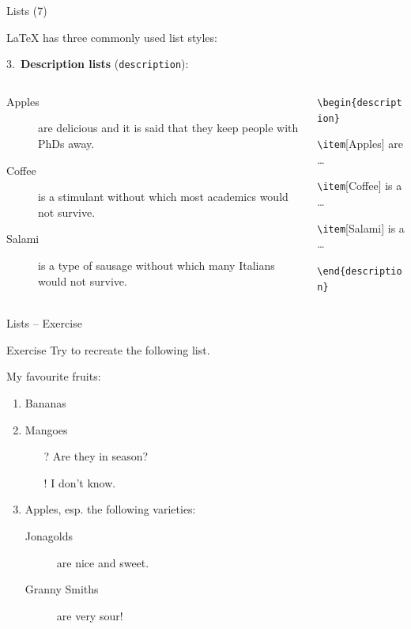 \documentclass{beamer}
\newcommand{\code}[1]{\texttt{#1}}
\newcommand{\switch}[1]{\texttt{\textbackslash#1}}
\newcommand{\command}[2]{\texttt{\textbackslash#1\{#2\}}}
\begin{document}
\begin{frame}{Lists (7)}

    \LaTeX{} has three commonly used list styles:

    \bigskip

    3.\ \textbf{Description lists} (\code{description}):

    \begin{columns}[t]
        \begin{column}{0.55\textwidth}
            \begin{description}
                \item[Apples] are delicious and it is said that they keep people with PhDs away.
                \item[Coffee] is a stimulant without which most academics would not survive.
                \item[Salami] is a type of sausage without which many Italians would not survive.
            \end{description}
        \end{column}
        \begin{column}{0.45\textwidth}
            \ttfamily
            \command{begin}{description}

            \quad\switch{item}[Apples] are \ldots

            \quad\switch{item}[Coffee] is a \ldots

            \quad\switch{item}[Salami] is a \ldots

            \command{end}{description}
        \end{column}
    \end{columns}
\end{frame}

\begin{frame}{Lists -- Exercise}
    \begin{block}{Exercise}
        Try to recreate the following list.

        \medskip

        My favourite fruits:

        \begin{enumerate}
            \item Bananas
            \item Mangoes
                  \begin{itemize}
                      \item[?] Are they in season?
                      \item[!] I don't know.
                  \end{itemize}
            \item Apples, esp. the following varieties:
                  \begin{description}
                      \item[Jonagolds] are nice and sweet.
                      \item[Granny Smiths] are very sour!
                  \end{description}
        \end{enumerate}
    \end{block}
\end{frame}
\end{document}
